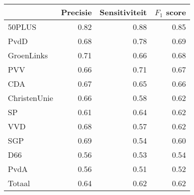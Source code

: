 \begin{tabular}{lrrr}
\toprule
{} &  Precisie &  Sensitiviteit &  $F_1$ score \\
\midrule
50PLUS       &       0.82 &    0.88 &      0.85\\
PvdD         &       0.68 &    0.78 &      0.69 \\
GroenLinks   &       0.71 &    0.66 &      0.68  \\
PVV          &       0.66 &    0.71 &      0.67  \\
CDA          &       0.67 &    0.65 &      0.66  \\
ChristenUnie &       0.66 &    0.58 &      0.62 \\
SP           &       0.61 &    0.64 &      0.62  \\
VVD          &       0.68 &    0.57 &      0.62  \\
SGP          &       0.69 &    0.54 &      0.60  \\
D66          &       0.56 &    0.53 &      0.54  \\
PvdA         &       0.56 &    0.51 &      0.52  \\
\midrule
Totaal       &       0.64 &    0.62 &      0.62  \\
\bottomrule
\end{tabular}
